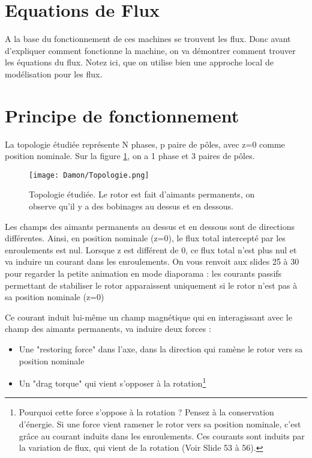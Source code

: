 \section{Equations de Flux} 
A la base du fonctionnement de ces machines se trouvent les flux. Donc avant d'expliquer comment fonctionne la machine, on va démontrer comment trouver les équations du flux. 
Notez ici, que on utilise bien une approche local de modélisation pour les flux. 



\section{Principe de fonctionnement}
La topologie étudiée représente N phases, p paire de pôles, avec z=0 comme position nominale. Sur la figure \ref{fig:topo}, on a 1 phase et 3 paires de pôles.

\begin{figure}
    \centering
    \texttt{[image: Damon/Topologie.png]}
    \caption{Topologie étudiée. Le rotor est fait d'aimants permanents, on observe qu'il y a des bobinages au dessus et en dessous.}
    \label{fig:topo}
\end{figure}

Les champs des aimants permanents au dessus et en dessous sont de directions différentes. Ainsi, en position nominale (z=0), le flux total intercepté par les enroulements est nul.
Lorsque z est différent de 0, ce flux total n'est plus nul et va induire un courant dans les enroulements. On vous renvoit aux slides 25 à 30 pour regarder la petite animation en mode diaporama : les courants passifs permettant de stabiliser le rotor apparaissent uniquement si le rotor n'est pas à sa position nominale (z=0)


Ce courant induit lui-même un champ magnétique qui en interagissant avec le champ des aimants permanents, va induire deux forces :
\begin{itemize}
    \item Une "restoring force" dans l'axe, dans la direction qui ramène le rotor vers sa position nominale
    \item Un "drag torque" qui vient s'opposer à la rotation\footnote{Pourquoi cette force s'oppose à la rotation ? Pensez à la conservation d'énergie. Si une force vient ramener le rotor vers sa position nominale, c'est grâce au courant induits dans les enroulements. Ces courants sont induits par la variation de flux, qui vient de la rotation (Voir Slide 53 à 56).}
\end{itemize}

